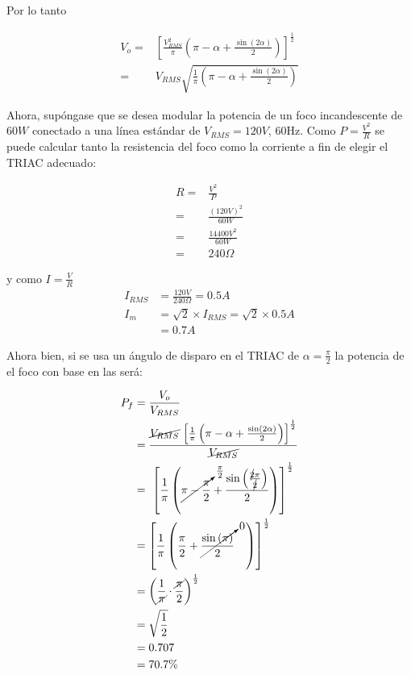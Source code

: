 \noindent Por lo tanto

\begin{align}
	V_o = &
		{\left[
			\frac{V^2_{RMS}}{\pi}
			\left(
				\pi-\alpha + \frac{\sin\left(2\alpha\right)}{2}
			\right)
		\right]}^\frac{1}{2}
		\\
	=&
		V_{RMS}\sqrt{
		\frac{1}{\pi}
		\left(
			\pi-\alpha + \frac{\sin\left(2\alpha\right)}{2}
		\right)
		}
	\label{eq:po}
\end{align}

Ahora, supóngase que se desea modular la potencia de un foco incandescente de $60W$ conectado a una línea estándar de $V_{RMS}=120V$, 60Hz.
Como $P=\frac{V^2}{R}$ se puede calcular tanto la resistencia del foco como la corriente a fin de elegir el TRIAC adecuado:

\begin{align*}
	R =& \frac{V^2}{P} \\
	=&
		\frac{{\left(120V\right)}^2}{60W} \\
	=&
		\frac{14400V^2}{60W} \\
	=& 240\Omega
\end{align*}

\noindent y como $I=\frac{V}{R}$
\begin{align*}
	I_{RMS} & = \frac{120V}{240\Omega} = 0.5A\\
	I_{m} & = \sqrt{2} \times I_{RMS} =\sqrt{2} \times 0.5A\\
	      & = 0.7A
\end{align*}

\cleardoublepage
Ahora bien, si se usa un ángulo de disparo en el TRIAC de $\alpha = \frac{\pi}{2}$ la potencia de el foco con base en las  será:

\begin{align*}
	P_f &= \frac{V_o}{V_{RMS}} \\
	&= \frac{\cancel{V_{RMS}}{~\left[
			\frac{1}{\pi}
			\left(
				\pi-\alpha + \frac{\sin\left(2\alpha\right)}{2}
			\right)
			\right]}^\frac{1}{2}
		}{\cancel{V_{RMS}}}
	\\
	&=
		{~\left[
			\frac{1}{\pi}
			\left(
				\cancelto{\frac{\pi}{2}}{\pi-\frac{\pi}{2}} +
				\frac{\sin\left(\frac{\cancel{2}\pi}{\cancel{2}}\right)}{2}
			\right)
		\right]}^\frac{1}{2}
	\\
	&=
		{\left[
			\frac{1}{\pi}
			\left(
				\frac{\pi}{2} +
				\cancelto{0}{\frac{\sin\left(\pi\right)}{2}}
			~~~\right)
		\right]}^\frac{1}{2}
	\\
	&=
		{\left(
			\frac{1}{\cancel{\pi}}
			\cdot
			\frac{\cancel{\pi}}{2}
		\right)}^\frac{1}{2}
	\\
	&= \sqrt{\frac{1}{2}}\\
	&= 0.707 \\
	&= 70.7\%
\end{align*}

